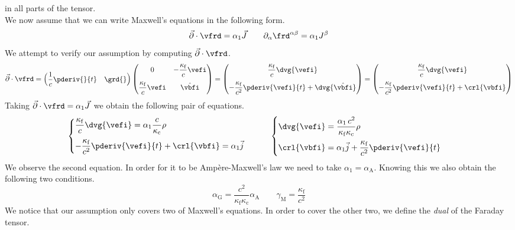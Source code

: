 in all parts of the tensor.\\[1em]
We now assume that we can write Maxwell's equations in the following form.
\[\vec{\partial} \cdot \vfrd = \alpha_1 \vec{J} \qquad \partial_\alpha \frd^{\alpha\beta} = \alpha_1 J^\beta\]
We attempt to verify our assumption by computing \(\vec{\partial} \cdot \vfrd\).
\[
\vec{\partial} \cdot \vfrd = \begin{pmatrix}\displaystyle \frac{1}{c} \pderiv{}{t} & \grd{}\end{pmatrix} \begin{pmatrix} 0 & -\dfrac{\kappa_\mathrm{f}}{c} \vefi \\[1em] \dfrac{\kappa_\mathrm{f}}{c} \vefi & \hat{\vbfi} \\ \end{pmatrix}
 = \begin{pmatrix}\displaystyle \frac{\kappa_\mathrm{f}}{c} \dvg{\vefi} \\[1em] \displaystyle - \frac{\kappa_\mathrm{f}}{c^2} \pderiv{\vefi}{t} + \dvg{\hat{\vbfi}}\end{pmatrix}
 = \begin{pmatrix}\displaystyle \frac{\kappa_\mathrm{f}}{c} \dvg{\vefi} \\[1em] \displaystyle - \frac{\kappa_\mathrm{f}}{c^2} \pderiv{\vefi}{t} + \crl{\vbfi}\end{pmatrix}
\]
Taking \(\vec{\partial} \cdot \vfrd = \alpha_1 \vec{J}\) we obtain the following pair of equations.
\[\begin{cases}
\dfrac{\kappa_\mathrm{f}}{c} \dvg{\vefi} = \alpha_1 \dfrac{c}{\kappa_\mathrm{c}} \rho \\[1em]
- \displaystyle \frac{\kappa_\mathrm{f}}{c^2} \pderiv{\vefi}{t} + \crl{\vbfi} = \alpha_1 \vec{j}
\end{cases} \qquad \begin{cases}
\dvg{\vefi} = \dfrac{\alpha_1 \, c^2}{\kappa_\mathrm{f} \kappa_\mathrm{c}} \rho \\[1em]
\displaystyle \crl{\vbfi} = \alpha_1 \vec{j} + \frac{\kappa_\mathrm{f}}{c^2} \pderiv{\vefi}{t}
\end{cases}\]
We observe the second equation. In order for it to be Ampère-Maxwell's law
we need to take \(\alpha_1 = \alpha_\mathrm{A}\). Knowing this we also
obtain the following two conditions.
\[\alpha_\mathrm{G} = \dfrac{c^2}{\kappa_\mathrm{f} \kappa_\mathrm{c}} \alpha_\mathrm{A} \qquad \gamma_\mathrm{M} = \frac{\kappa_\mathrm{f}}{c^2} \]
We notice that our assumption only covers two of Maxwell's equations.
In order to cover the other two, we define the \emph{dual} of the Faraday tensor.
